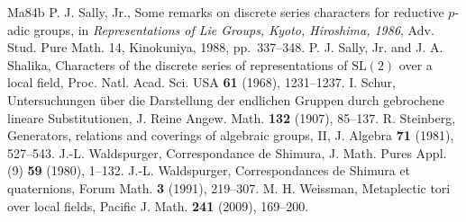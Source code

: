 \documentclass[12pt,letterpaper]{article}
\numberwithin{equation}{section}
\theoremstyle{definition}
\theoremstyle{remark}
\begin{document}
\begin{thebibliography}{Ma84b}
 P. J. Sally, Jr., Some remarks on discrete series characters for reductive $p$-adic groups, in \emph{Representations of Lie Groups, Kyoto, Hiroshima, 1986}, Adv. Stud. Pure Math. 14, Kinokuniya, 1988, pp.~337--348.
 P. J. Sally, Jr. and J. A. Shalika, Characters of the discrete series of representations of $\mathrm{SL}(2)$ over a local field, Proc. Natl. Acad. Sci. USA \textbf{61} (1968), 1231--1237.
 I. Schur, Untersuchungen \"uber die Darstellung der endlichen Gruppen durch gebrochene lineare Substitutionen, J. Reine Angew. Math. \textbf{132} (1907), 85--137.
 R. Steinberg, Generators, relations and coverings of algebraic groups, II, J. Algebra \textbf{71} (1981), 527--543.
 J.-L. Waldspurger, Correspondance de Shimura, J. Math. Pures Appl. (9) \textbf{59} (1980), 1--132.
 J.-L. Waldspurger, Correspondances de Shimura et quaternions, Forum Math. \textbf{3} (1991), 219--307.
 M. H. Weissman, Metaplectic tori over local fields, Pacific J. Math. \textbf{241} (2009), 169--200.
\end{thebibliography}
\end{document}

